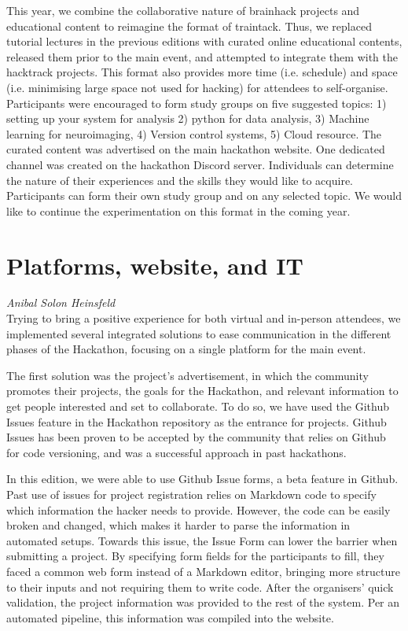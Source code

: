 \documentclass[10pt,a4paper,twocolumns]{proc}
\newcommand{\authors}[1]{\emph{\footnotesize #1} \\}
\begin{document}
This year, we combine the collaborative nature of brainhack projects and
educational content to reimagine the format of traintack. Thus, we
replaced tutorial lectures in the previous editions with curated online
educational contents, released them prior to the main event, and
attempted to integrate them with the hacktrack projects. This format
also provides more time (i.e. schedule) and space (i.e. minimising large
space not used for hacking) for attendees to self-organise. Participants
were encouraged to form study groups on five suggested topics: 1)
setting up your system for analysis 2) python for data analysis, 3)
Machine learning for neuroimaging, 4) Version control systems, 5) Cloud
resource. The curated content was advertised on the main hackathon
website. One dedicated channel was created on the hackathon Discord
server. Individuals can determine the nature of their experiences and
the skills they would like to acquire. Participants can form their own
study group and on any selected topic. We would like to continue the
experimentation on this format in the coming year.

\section{Platforms, website, and IT}
\authors{Anibal Solon Heinsfeld}
%

Trying to bring a positive experience for both virtual and in-person
attendees, we implemented several integrated solutions to ease
communication in the different phases of the Hackathon, focusing on a
single platform for the main event.

The first solution was the project's advertisement, in which the
community promotes their projects, the goals for the Hackathon, and
relevant information to get people interested and set to collaborate. To
do so, we have used the Github Issues feature in the Hackathon
repository as the entrance for projects. Github Issues has been proven
to be accepted by the community that relies on Github for code
versioning, and was a successful approach in past hackathons.

In this edition, we were able to use Github Issue forms, a beta feature
in Github. Past use of issues for project registration relies on
Markdown code to specify which information the hacker needs to provide.
However, the code can be easily broken and changed, which makes it
harder to parse the information in automated setups. Towards this issue,
the Issue Form can lower the barrier when submitting a project. By
specifying form fields for the participants to fill, they faced a common
web form instead of a Markdown editor, bringing more structure to their
inputs and not requiring them to write code. After the organisers' quick
validation, the project information was provided to the rest of the
system. Per an automated pipeline, this information was compiled into
the website.
\end{document}
